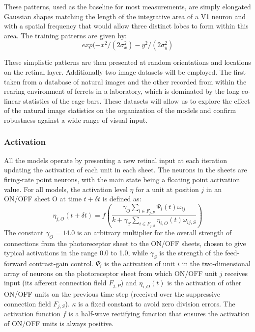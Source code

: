These patterns, used as the baseline for most measurements, are simply
elongated Gaussian shapes matching the length of the integrative area
of a V1 neuron and with a spatial frequency that would allow three
distinct lobes to form within this area. The training patterns are
given by:
\begin{equation}
  exp(-x^2/(2\sigma_x^2) - y^2/(2\sigma_y^2)
\label{eqn:gausspattern}
\end{equation}

These simplistic patterns are then presented at random orientations
and locations on the retinal layer. Additionally two image datasets
will be employed. The first taken from a database of natural images
and the other recorded from within the rearing environment of ferrets
in a laboratory, which is dominated by the long co-linear statistics
of the cage bars. These datasets will allow us to explore the effect
of the natural image statistics on the organization of the models and
confirm robustness against a wide range of visual input.

\subsubsection*{Activation}

All the models operate by presenting a new retinal input at each
iteration updating the activation of each unit in each sheet. The
neurons in the sheets are firing-rate point neurons, with the main
state being a floating point activation value.  For all models, the
activation level $\eta$ for a unit at position $j$ in an ON/OFF sheet
O at time $t+\delta t$ is defined as:
\begin{equation}
\eta_{j, O}(t+\delta t)=f\left(\frac{\gamma_{O}\sum_{i\in
    F_{j,P}}\Psi_{i}(t)\omega_{ij}}{k+\gamma_{S}\sum_{i\in
    F_{j,S}}\eta_{i, O}(t)\omega_{ij, S}}\right)
\label{eqn:lgnactivation}
\end{equation}
The constant $\gamma_{O}=14.0$ is an arbitrary multiplier for the
overall strength of connections from the photoreceptor sheet to the
ON/OFF sheets, chosen to give typical activations in the range 0.0 to
1.0, while $\gamma_{S}$ is the strength of the feed-forward
contrast-gain control. $\Psi_{i}$ is the activation of unit $i$ in the
two-dimensional array of neurons on the photoreceptor sheet from which
ON/OFF unit $j$ receives input (its afferent connection field
$F_{j,P}$) and $\eta_{i, O}(t)$ is the activation of other ON/OFF
units on the previous time step (received over the suppressive
connection field $F_{j,S}$). $\kappa$ is a fixed constant to avoid
zero division errors. The activation function $f$ is a half-wave
rectifying function that ensures the activation of ON/OFF units is
always positive.

